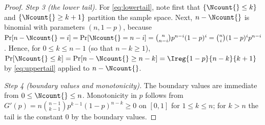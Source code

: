 \begin{proof}
\emph{Step 3 (the lower tail).} For \eqref{eq:lowertail}, note first that
$\{\Ncount{}\le k\}$ and $\{\Ncount{}\ge k+1\}$ partition the sample space.
Next, $n-\Ncount{}$ is binomial with parameters $(n,1-p)$, because
$\Pr[n-\Ncount{}=i]=\Pr[\Ncount{}=n-i]
=\binom{n}{n-i}p^{n-i}(1-p)^{i}=\binom{n}{i}(1-p)^{i}p^{n-i}$. Hence, for
$0\le k\le n-1$ (so that $n-k\ge1$),
$\Pr[\Ncount{}\le k]=\Pr[n-\Ncount{}\ge n-k]=\Ireg{1-p}{n-k}{k+1}$ by
\eqref{eq:uppertail} applied to $n-\Ncount{}$.

\emph{Step 4 (boundary values and monotonicity).} The boundary values are
immediate from $0\le\Ncount{}\le n$. Monotonicity in $p$ follows from
$G'(p)=n\binom{n-1}{k-1}p^{k-1}(1-p)^{n-k}\ge0$ on $[0,1]$ for $1\le k\le n$;
for $k>n$ the tail is the constant $0$ by the boundary values.
\end{proof}
